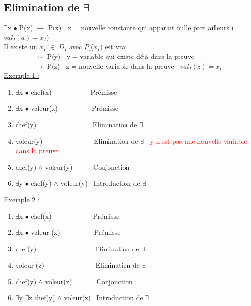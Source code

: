 \begin{flushleft}
\chapter{Elimination de $\exists$}
$\exists$x $\bullet$ P(x) $\rightarrow$ P(x) $\>$ x = nouvelle constante qui apparait nulle part ailleurs ($val_{I}(a) = x_{I}$)\\
Il existe un $x_{I}$ $\in$ $D_{I}$ avec $P_{I}$($x_{I}$) est vrai\\
$\>$ $\>$ $\>$ $\>$ $\>$ $\>$ $\>$ $\>$ $\nrightarrow$ P(y) $\>$ y = variable qui existe d\'ej\`a dans la preuve \\
$\>$ $\>$ $\>$ $\>$ $\>$ $\>$ $\>$ $\>$ $\rightarrow$ P(z) $\>$ z = nouvelle variable dans la preuve $\>$ $val_{I}(z) = x_{I}$\\
\underline{Exemple 1 :}\\
\begin{enumerate}
\item $\exists$x $\bullet$ chef(x) $\>$ $\>$ $\>$ $\>$ $\>$ $\>$ $\>$ $\>$ $\>$ $\>\>$Pr\'emisse
\item $\exists$x $\bullet$ voleur(x) $\>$ $\>$ $\>$ $\>$ $\>$ $\>$ $\>$ $\>$  $\>$Pr\'emisse
\item chef(y) $\>$ $\>$ $\>$ $\>$ $\>$ $\>$ $\>$ $\>$ $\>$ $\>$ $\>$ $\>$ $\>$ $\>$ $\>$Elimination de $\exists$
\item \sout{voleur(y)} $\>$ $\>$ $\>$ $\>$ $\>$ $\>$ $\>$ $\>$ $\>$ $\>$ $\>$ $\>$ $\>$ Elimination de $\exists$ $\>$ \textcolor{red}{y n'est pas une nouvelle variable dans la preuve}
\item chef(y) $\wedge$ voleur(y) $\>$ $\>$ $\>$ $\>$ $\>$ Conjonction
\item $\exists$y $\bullet$ chef(y) $\wedge$ voleur(y) $\>$ Introduction de $\exists$
\end{enumerate}

\underline{Exemple 2 :}\\
\begin{enumerate}
\item $\exists$x $\bullet$ chef(x) $\>$ $\>$ $\>$ $\>$ $\>$ $\>$ $\>$ $\>$ $\>$ $\>$ $\>$Pr\'emisse
\item $\exists$x $\bullet$ voleur (x) $\>$ $\>$ $\>$ $\>$ $\>$ $\>$ $\>$ $\>$ $\>$Pr\'emisse
\item chef(y) $\>$ $\>$ $\>$ $\>$ $\>$ $\>$ $\>$ $\>$ $\>$ $\>$ $\>$ $\>$ $\>$ $\>$ $\>$ Elimination de $\exists$
\item voleur (z) $\>$ $\>$ $\>$ $\>$ $\>$ $\>$ $\>$ $\>$ $\>$ $\>$ $\>$ $\>$ $\>$ Elimination de $\exists$
\item chef(y) $\wedge$ voleur(z) $\>$ $\>$ $\>$ $\>$ $\>$ $\>$ Conjonction
\item $\exists$y $\exists$z chef(y) $\wedge$ voleur(z) $\>$ Introduction de $\exists$
\end{enumerate}


\end{flushleft}

